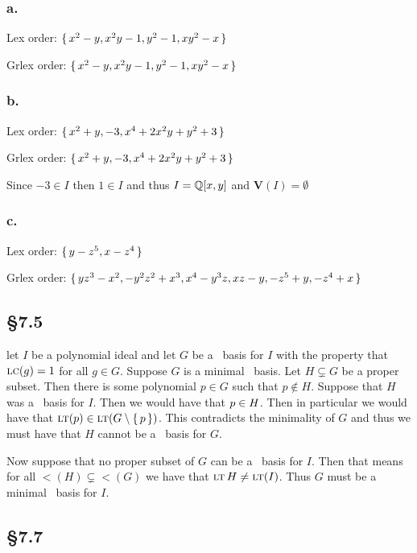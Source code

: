 \documentclass[letterpaper]{article}
\begin{document}
\subsubsection*{a.}

Lex order: $\set{x^{2} - y, x^{2} y - 1, y^{2} - 1, x y^{2} - x}$

Grlex order: $\set{x^{2} - y, x^{2} y - 1, y^{2} - 1, x y^{2} - x}$

\subsubsection*{b.}

Lex order: $\set{x^{2} + y, -3, x^{4} + 2 x^{2} y + y^{2} + 3}$

Grlex order: $\set{x^{2} + y, -3, x^{4} + 2 x^{2} y + y^{2} + 3}$

Since $-3 \in I$ then $1 \in I$ and thus $I = \Q\bqty{x, y}$ and $\textbf{V}(I) = \emptyset$

\subsubsection*{c.}

Lex order: $\set{y - z^{5}, x - z^{4}}$

Grlex order: $\set{y z^{3} - x^{2}, -y^{2} z^{2} + x^{3}, x^{4} - y^{3} z, x z - y, -z^{5} + y, -z^{4} + x}$

\subsection*{\S 7.5}

let $I$ be a polynomial ideal and let $G$ be a \Grobner\ basis for $I$ with the property that $\operatorname{\textsc{lc}}(g) = 1$ for all $g \in G$.
Suppose $G$ is a minimal \Grobner\ basis.
Let $H \subsetneq G$ be a proper subset.
Then there is some polynomial $p \in G$ such that $p \notin H$.
Suppose that $H$ was a \Grobner\ basis for $I$.
Then we would have that $p \in \gen{H}$.
Then in particular we would have that $\lt(p) \in \gen{\lt(G \setminus \set{p})}$.
This contradicts the minimality of $G$ and thus we must have that $H$ cannot be a \Grobner\ basis for $G$.

Now suppose that no proper subset of $G$ can be a \Grobner\ basis for $I$.
Then that means for all $\lt(H) \subsetneq \lt(G)$ we have that $\gen{\lt{H}} \neq \gen{\lt(I)}$.
Thus $G$ must be a minimal \Grobner\ basis for $I$.

\subsection*{\S 7.7}
\end{document}
